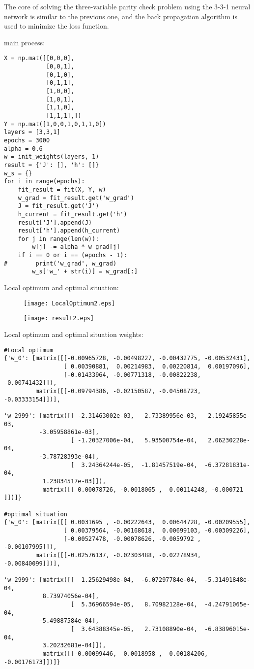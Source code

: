 The core of solving the three-variable parity check problem using the 3-3-1 neural network is similar to the previous one, and the back propagation algorithm is used to minimize the loss function.

\noindent main process:
\begin{lstlisting}
X = np.mat([[0,0,0],
            [0,0,1],
            [0,1,0],
            [0,1,1],
            [1,0,0],
            [1,0,1],
            [1,1,0],
            [1,1,1],])
Y = np.mat([1,0,0,1,0,1,1,0])
layers = [3,3,1]
epochs = 3000
alpha = 0.6
w = init_weights(layers, 1)
result = {'J': [], 'h': []}
w_s = {}
for i in range(epochs):
    fit_result = fit(X, Y, w)
    w_grad = fit_result.get('w_grad')
    J = fit_result.get('J')
    h_current = fit_result.get('h')
    result['J'].append(J)
    result['h'].append(h_current)
    for j in range(len(w)):
        w[j] -= alpha * w_grad[j]
    if i == 0 or i == (epochs - 1):
#        print('w_grad', w_grad)
        w_s['w_' + str(i)] = w_grad[:]
\end{lstlisting}

\noindent Local optimum and optimal situation:
\begin{figure}[!h]
\begin{minipage}
{0.5\linewidth}
\centering
\texttt{[image: LocalOptimum2.eps]}
\end{minipage}
%
\begin{minipage}
{0.5\linewidth}
\centering
\texttt{[image: result2.eps]}
\end{minipage}
\end{figure}

\noindent Local optimum and optimal situation weights:
\begin{lstlisting}
#Local optimum
{'w_0': [matrix([[-0.00965728, -0.00498227, -0.00432775, -0.00532431],
                 [ 0.00390881,  0.00214983,  0.00220814,  0.00197096],
                 [-0.01433964, -0.00771318, -0.00822238, -0.00741432]]),
         matrix([[-0.09794386, -0.02150587, -0.04508723, -0.03333154]])],

'w_2999': [matrix([[ -2.31463002e-03,   2.73389956e-03,   2.19245855e-03,
          -3.05958861e-03],
                   [ -1.20327006e-04,   5.93500754e-04,   2.06230228e-04,
          -3.78728393e-04],
                   [  3.24364244e-05,  -1.81457519e-04,  -6.37281831e-04,
           1.23834517e-03]]),
           matrix([[ 0.00078726, -0.0018065 ,  0.00114248, -0.000721  ]])]}

#optimal situation
{'w_0': [matrix([[ 0.0031695 , -0.00222643,  0.00644728, -0.00209555],
                 [ 0.00379564, -0.00168618,  0.00699103, -0.00309226],
                 [-0.00527478, -0.00078626, -0.0059792 , -0.00107995]]),
         matrix([[-0.02576137, -0.02303488, -0.02278934, -0.00840099]])],

'w_2999': [matrix([[  1.25629498e-04,  -6.07297784e-04,  -5.31491848e-04,
           8.73974056e-04],
                   [  5.36966594e-05,   8.70982128e-04,  -4.24791065e-04,
          -5.49887584e-04],
                   [  3.64388345e-05,   2.73108890e-04,  -6.83896015e-04,
           3.20232681e-04]]),
           matrix([[-0.00099446,  0.0018958 ,  0.00184206, -0.00176173]])]}
\end{lstlisting}

